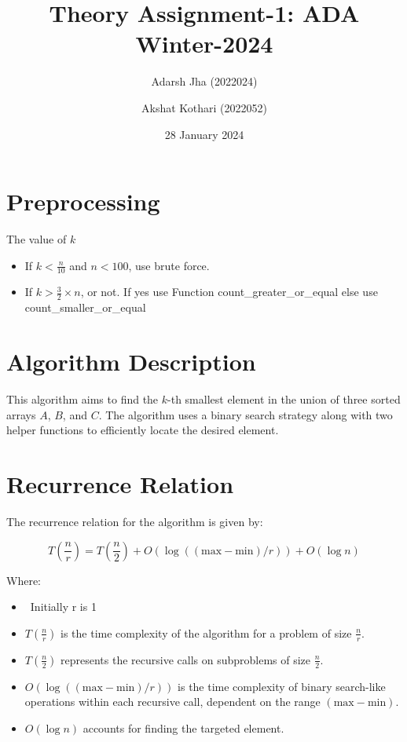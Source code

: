 \documentclass{article}
\title{Theory Assignment-1: ADA Winter-2024}
\author{Adarsh Jha (2022024) \and Akshat Kothari (2022052)}
\date{28 January 2024}
\begin{document}
\maketitle

\section{Preprocessing}
The value of $k$
\begin{itemize}
    \item If \(k < \frac{n}{10}\) and \(n < 100\), use brute force.
    \item If \(k > \frac{3}{2} \times n\), or not. If yes use Function {count\_greater\_or\_equal} else use {count\_smaller\_or\_equal}
\end{itemize}

\section{Algorithm Description}
This algorithm aims to find the $k$-th smallest element in the union of three sorted arrays $A$, $B$, and $C$. The algorithm uses a binary search strategy along with two helper functions to efficiently locate the desired element.

\section{Recurrence Relation}

The recurrence relation for the algorithm is given by:

\[
T\left(\frac{n}{r}\right) = T\left(\frac{n}{2}\right) + O(\log((\text{max} - \text{min})/r)) + O(\log n)
\]

Where:
\begin{itemize}
    \item \ Initially r is 1
    \item \( T\left(\frac{n}{r}\right) \) is the time complexity of the algorithm for a problem of size \( \frac{n}{r} \).
    \item \( T\left(\frac{n}{2}\right) \) represents the recursive calls on subproblems of size \( \frac{n}{2} \).
    \item \( O(\log((\text{max} - \text{min})/r)) \) is the time complexity of binary search-like operations within each recursive call, dependent on the range \((\text{max} - \text{min})\).
    \item \( O(\log n) \) accounts for finding the targeted element.
\end{itemize}
\end{document}

